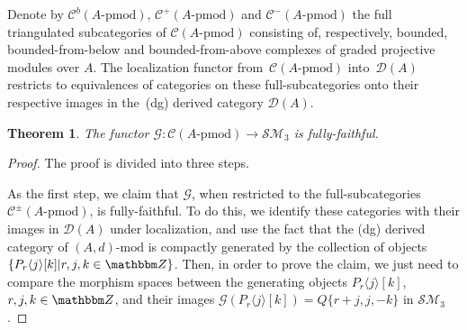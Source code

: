 \documentclass[pdftex]{sigma}
\newtheorem{thm}{Theorem}[section]
\theoremstyle{definition}
\numberwithin{equation}{section}
\def\Z{{\mathbbm Z}}
\def\lra{{\longrightarrow}}
\def\dmod{{\mathrm{\mbox{-}mod}}} %
\def\pmod{{\mathrm{\mbox{-}pmod}}} %
\def\mc{\mathcal}
\begin{document}
Denote by $\mc{C}^b(A\pmod)$, $\mc{C}^+(A\pmod)$ and $\mc{C}^-(A\pmod)$ the full triangulated subcategories of $\mc{C}(A\pmod)$ consisting of, respectively, bounded, bounded-from-below and bounded-from-above complexes of graded projective modules over $A$. The localization functor from~$\mc{C}(A\pmod)$ into~$\mc{D}(A)$ restricts to equivalences of categories on these full-subcategories onto their respective images in the~(dg) derived category $\mc{D}(A)$.

\begin{thm}\label{thm-faithful-embedding}
The functor $\mc{G}\colon \mc{C}(A\pmod)\lra \mc{SM}_3$ is fully-faithful.
\end{thm}
\begin{proof}The proof is divided into three steps.

As the first step, we claim that $\mc{G}$, when restricted to the full-subcategories $\mc{C}^\pm(A\pmod)$, is fully-faithful. To do this, we identify these categories with their images in $\mc{D}(A)$ under localization, and use the fact that the (dg) derived category of $(A, d)\dmod$ is compactly generated by the collection of objects $\{P_r\langle j\rangle[k]|r,j,k\in \Z\}$. Then, in order to prove the claim, we just need to compare the morphism spaces between the generating objects $P_{r}\langle j \rangle[k]$, $r,j,k\in \Z$, and their images $\mc{G}(P_{r}\langle j \rangle[k])=Q\{r+j,j,-k\}$ in $\mc{SM}_3$ \cite[Lemma~4.2]{K}.


\end{proof}
\end{document}
